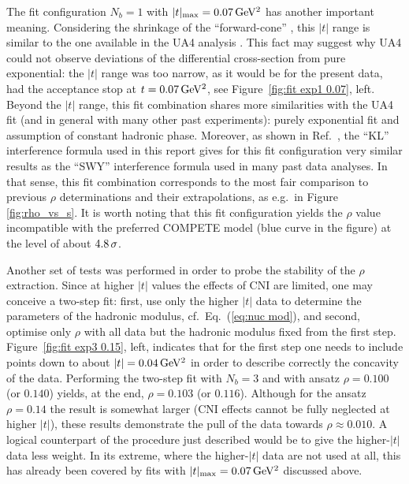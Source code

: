 The fit configuration $N_b=1$ with $|t|_{\rm max} = 0.07\,{\rm GeV^2}$ has another important meaning. Considering the shrinkage of the ``forward-cone'' , this $|t|$ range is similar to the one available in the UA4 analysis \cite{ua4-rho}. This fact may suggest why UA4 could not observe deviations of the differential cross-section from pure exponential: the $|t|$ range was too narrow, as it would be for the present data, had the acceptance stop at $t = 0.07\,{\rm GeV^2}$, see Figure~\ref{fig:fit exp1 0.07}, left. Beyond the $|t|$ range, this fit combination shares more similarities with the UA4 fit (and in general with many other past experiments): purely exponential fit and assumption of constant hadronic phase. Moreover, as shown in Ref.~\cite{totem-8tev-1km}, the ``KL'' interference formula \cite{kl94} used in this report gives for this fit configuration very similar results as the ``SWY'' interference formula \cite{wy68} used in many past data analyses. In that sense, this fit combination corresponds to the most fair comparison to previous $\rho$ determinations and their extrapolations, as e.g.~in Figure \ref{fig:rho_vs_s}. It is worth noting that this fit configuration yields the $\rho$ value incompatible with the preferred COMPETE model (blue curve in the figure) at the level of about $4.8\,{\rm \sigma}$.

Another set of tests was performed in order to probe the stability of the $\rho$ extraction. Since at higher $|t|$ values the effects of CNI are limited, one may conceive a two-step fit: first, use only the higher $|t|$ data to determine the parameters of the hadronic modulus, cf.~Eq.~(\ref{eq:nuc mod}), and second, optimise only $\rho$ with all data but the hadronic modulus fixed from the first step. Figure~\ref{fig:fit exp3 0.15}, left, indicates that for the first step one needs to include points down to about $|t| = 0.04\,{\rm GeV^2}$ in order to describe correctly the concavity of the data. Performing the two-step fit with $N_b=3$ and with ansatz $\rho = 0.100$ (or $0.140$) yields, at the end, $\rho = 0.103$ (or $0.116$). %
Although for the ansatz $\rho = 0.14$ the result is somewhat larger (CNI effects cannot be fully neglected at higher $|t|$), these results demonstrate the pull of the data towards $\rho \approx 0.010$. A logical counterpart of the procedure just described would be to give the higher-$|t|$ data less weight. In its extreme, where the higher-$|t|$ data are not used at all, this has already been covered by fits with $|t|_{\rm max} = 0.07\,{\rm GeV^2}$ discussed above.


